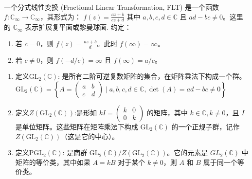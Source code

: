 \documentclass[../../复变函数.tex]{subfiles}
\begin{document}
\begin{definition}
    一个分式线性变换 (Fractional Linear Transformation, FLT) 是一个函数 $f: \mathbb{C}_{\infty} \to \mathbb{C}_{\infty}$，其形式为：
$f(z) = \frac{az+b}{cz+d}$
其中 $a, b, c, d \in \mathbb{C}$ 且 $ad-bc \neq 0$。这里的 $\mathbb{C}_{\infty}$ 表示扩展复平面或黎曼球面.
约定：
\begin{enumerate}
    \item 若 $c=0$，则 $f(z) = \frac{az+b}{d}$。此时 $f(\infty) = \infty$。
    \item 若 $c \neq 0$，则 $f(-d/c) = \infty$ 且 $f(\infty) = a/c$。
    
\end{enumerate}

\end{definition}

\begin{definition}
    \begin{enumerate}
        \item 定义$\mathrm{GL}_2(\mathbb{C})$: 是所有二阶可逆复数矩阵的集合，在矩阵乘法下构成一个群。
$\mathrm{GL}_2(\mathbb{C}) = \left\{ A = \begin{pmatrix} a & b \\ c & d \end{pmatrix} \mid a, b, c, d \in \mathbb{C}, \det(A) = ad-bc \neq 0 \right\}$
        \item 定义$Z(\mathrm{GL}_2(\mathbb{C}))$:是形如 $kI = \begin{pmatrix} k & 0 \\ 0 & k \end{pmatrix}$ 的矩阵，其中 $k \in \mathbb{C}, k \neq 0$，且 $I$ 是单位矩阵。这些矩阵在矩阵乘法下构成 $\mathrm{GL}_2(\mathbb{C})$ 的一个正规子群，记作 $Z(\mathrm{GL}_2(\mathbb{C}))$（这是它的中心）。
        \item  定义$\mathrm{PGL}_2(\mathbb{C})$: 是商群 $\mathrm{GL}_2(\mathbb{C}) / Z(\mathrm{GL}_2(\mathbb{C}))$。它的元素是 $GL_2(\mathbb{C})$ 中矩阵的等价类，其中如果 $A = kB$ 对于某个 $k \neq 0$，则 $A$ 和 $B$ 属于同一个等价类。
    \end{enumerate}
    
\end{definition}
\end{document}
